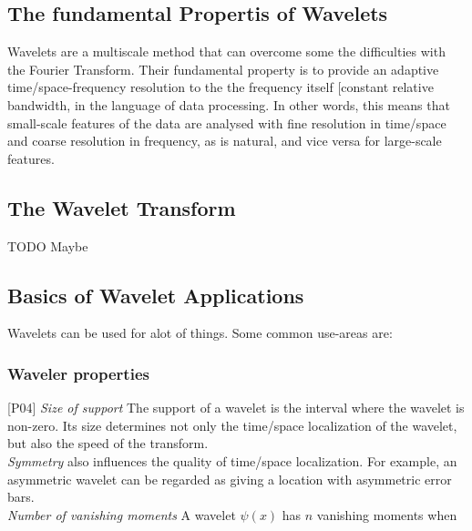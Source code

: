 \documentclass[12pt]{article}
\begin{document}
	\subsection{The fundamental Propertis of Wavelets}
	Wavelets are a multiscale method that can overcome some the difficulties with the Fourier Transform. Their fundamental
	property is to provide an adaptive time/space-frequency resolution to the the frequency itself [constant relative bandwidth, in the  
	language of data processing. In other words, this means that small-scale features of the data are analysed with fine resolution in
	time/space and coarse resolution in frequency, as is natural, and vice versa for large-scale features.
	 
	 \subsection{The Wavelet Transform}
	 TODO Maybe
	 
	 \subsection{Basics of Wavelet Applications}
	 Wavelets can be used for alot of things. Some common use-areas are:
	    
	    \subsubsection{Waveler properties}
	    [P04]
	    \textit{Size of support} The support of a wavelet is the interval where the wavelet is non-zero. Its size determines not only the time/space localization of the wavelet, but also the speed of the transform.\\
			
			\textit{Symmetry} also influences the quality of time/space localization. For example, an asymmetric wavelet can be regarded as giving a location with asymmetric error bars.\\

			\textit{Number of vanishing moments} A wavelet $\psi(x)$ has $n$ vanishing moments when
			
\end{document}
